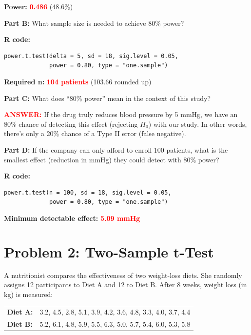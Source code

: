 \documentclass[11pt]{article}
\begin{document}
\textbf{Power:} \textcolor{red}{\textbf{0.486}} (48.6\%)

\vspace{0.3cm}

\textbf{Part B:} What sample size is needed to achieve 80\% power?

\textbf{R code:}
\begin{lstlisting}
power.t.test(delta = 5, sd = 18, sig.level = 0.05,
             power = 0.80, type = "one.sample")
\end{lstlisting}

\textbf{Required n:} \textcolor{red}{\textbf{104 patients}} (103.66 rounded up)

\vspace{0.3cm}

\textbf{Part C:} What does ``80\% power'' mean in the context of this study?

\textcolor{red}{\textbf{ANSWER:}} If the drug truly reduces blood pressure by 5 mmHg, we have an 80\% chance of detecting this effect (rejecting $H_0$) with our study. In other words, there's only a 20\% chance of a Type II error (false negative).

\vspace{0.3cm}

\textbf{Part D:} If the company can only afford to enroll 100 patients, what is the smallest effect (reduction in mmHg) they could detect with 80\% power?

\textbf{R code:}
\begin{lstlisting}
power.t.test(n = 100, sd = 18, sig.level = 0.05,
             power = 0.80, type = "one.sample")
\end{lstlisting}

\textbf{Minimum detectable effect:} \textcolor{red}{\textbf{5.09 mmHg}}

\newpage

\section{Problem 2: Two-Sample t-Test}

A nutritionist compares the effectiveness of two weight-loss diets. She randomly assigns 12 participants to Diet A and 12 to Diet B. After 8 weeks, weight loss (in kg) is measured:

\vspace{0.3cm}

\begin{center}
\begin{tabular}{ll}
\textbf{Diet A:} & 3.2, 4.5, 2.8, 5.1, 3.9, 4.2, 3.6, 4.8, 3.3, 4.0, 3.7, 4.4 \\
\textbf{Diet B:} & 5.2, 6.1, 4.8, 5.9, 5.5, 6.3, 5.0, 5.7, 5.4, 6.0, 5.3, 5.8
\end{tabular}
\end{center}
\end{document}
